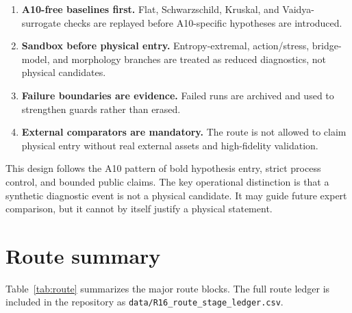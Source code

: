 \documentclass[11pt,a4paper]{article}
\begin{document}
\begin{enumerate}
  \item \textbf{A10-free baselines first.} Flat, Schwarzschild, Kruskal, and Vaidya-surrogate checks are replayed before A10-specific hypotheses are introduced.
  \item \textbf{Sandbox before physical entry.} Entropy-extremal, action/stress, bridge-model, and morphology branches are treated as reduced diagnostics, not physical candidates.
  \item \textbf{Failure boundaries are evidence.} Failed runs are archived and used to strengthen guards rather than erased.
  \item \textbf{External comparators are mandatory.} The route is not allowed to claim physical entry without real external assets and high-fidelity validation.
\end{enumerate}

This design follows the A10 pattern of bold hypothesis entry, strict process control, and bounded public claims. The key operational distinction is that a synthetic diagnostic event is not a physical candidate. It may guide future expert comparison, but it cannot by itself justify a physical statement.

\section{Route summary}

Table~\ref{tab:route} summarizes the major route blocks. The full route ledger is included in the repository as \texttt{data/R16\_route\_stage\_ledger.csv}.
\end{document}
